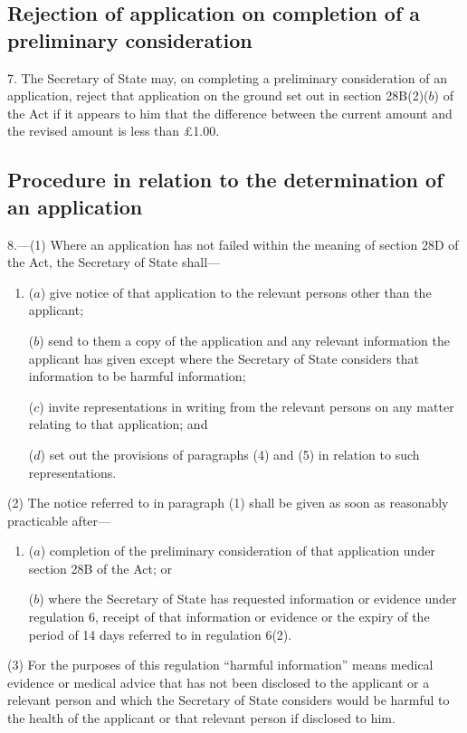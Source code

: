 \documentclass[a4paper]{article}
\begin{document}
\subsection[7. Rejection of application on completion of a preliminary consideration]{Rejection of application on completion of a preliminary consideration}

7.  The Secretary of State may, on completing a preliminary consideration of an application, reject that application on the ground set out in section 28B(2)($b$) of the Act if it appears to him that the difference between the current amount and the revised amount is less than £1.00.

\subsection[8. Procedure in relation to the determination of an application]{Procedure in relation to the determination of an application}

8.—(1) Where an application has not failed within the meaning of section 28D of the Act, the Secretary of State shall—
\begin{enumerate}\item[]
($a$) give notice of that application to the relevant persons other than the applicant;

($b$) send to them a copy of the application and any relevant information the applicant has given except where the Secretary of State considers that information to be harmful information;

($c$) invite representations in writing from the relevant persons on any matter relating to that application; and

($d$) set out the provisions of paragraphs (4) and (5) in relation to such representations.
\end{enumerate}

(2) The notice referred to in paragraph (1) shall be given as soon as reasonably practicable after—
\begin{enumerate}\item[]
($a$) completion of the preliminary consideration of that application under section 28B of the Act; or

($b$) where the Secretary of State has requested information or evidence under regulation 6, receipt of that information or evidence or the expiry of the period of 14 days referred to in regulation 6(2).
\end{enumerate}

(3) For the purposes of this regulation “harmful information” means medical evidence or medical advice that has not been disclosed to the applicant or a relevant person and which the Secretary of State considers would be harmful to the health of the applicant or that relevant person if disclosed to him.
\end{document}
